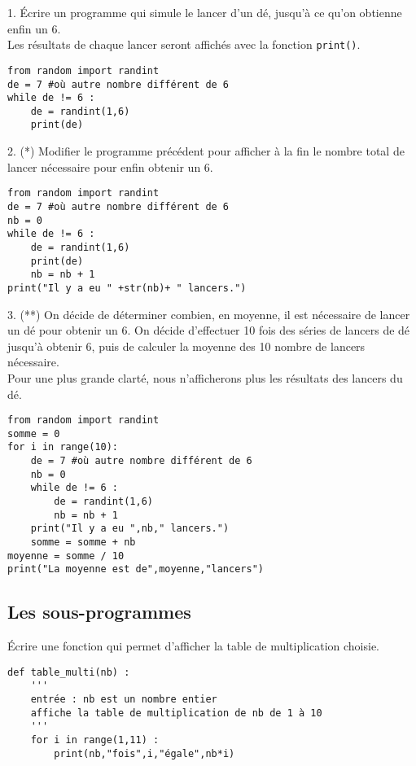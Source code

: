 \begin{cor}[Jeu de dé (**)]
\begin{multicols}{2}
1. Écrire un programme qui simule le lancer d'un dé, jusqu'à ce qu'on obtienne enfin un 6.\\
Les résultats de chaque lancer seront affichés avec la fonction \texttt{print()}.\\
\columnbreak
\begin{lstlisting}
from random import randint
de = 7 #où autre nombre différent de 6
while de != 6 :
	de = randint(1,6)
	print(de)
\end{lstlisting}
\end{multicols}
\begin{multicols}{2}
2. (*) Modifier le programme précédent pour afficher à la fin le nombre total de lancer nécessaire pour enfin obtenir un 6.\\
\columnbreak
\begin{lstlisting}
from random import randint
de = 7 #où autre nombre différent de 6
nb = 0
while de != 6 :
	de = randint(1,6)
	print(de)
	nb = nb + 1
print("Il y a eu " +str(nb)+ " lancers.")
\end{lstlisting}
\end{multicols}
\begin{multicols}{2}
3. (**) On décide de déterminer combien, en moyenne, il est nécessaire de lancer un dé pour obtenir un 6. On décide d'effectuer 10 fois des séries de lancers de dé jusqu'à obtenir 6, puis de calculer la moyenne des 10 nombre de lancers nécessaire.\\
Pour une plus grande clarté, nous n'afficherons plus les résultats des lancers du dé.\\
\columnbreak
\begin{lstlisting}
from random import randint
somme = 0
for i in range(10):
	de = 7 #où autre nombre différent de 6
	nb = 0
	while de != 6 :
		de = randint(1,6)
		nb = nb + 1
	print("Il y a eu ",nb," lancers.")
	somme = somme + nb
moyenne = somme / 10
print("La moyenne est de",moyenne,"lancers")
\end{lstlisting}
\end{multicols}
\end{cor}




\subsection{Les sous-programmes}
\begin{cor}
\begin{multicols}{2}
Écrire une fonction qui permet d'afficher la table de multiplication choisie.\\
\columnbreak
\begin{lstlisting}
def table_multi(nb) :
	'''
	entrée : nb est un nombre entier
	affiche la table de multiplication de nb de 1 à 10
	'''
	for i in range(1,11) :
		print(nb,"fois",i,"égale",nb*i)
\end{lstlisting}
\end{multicols}
\end{cor}
 
